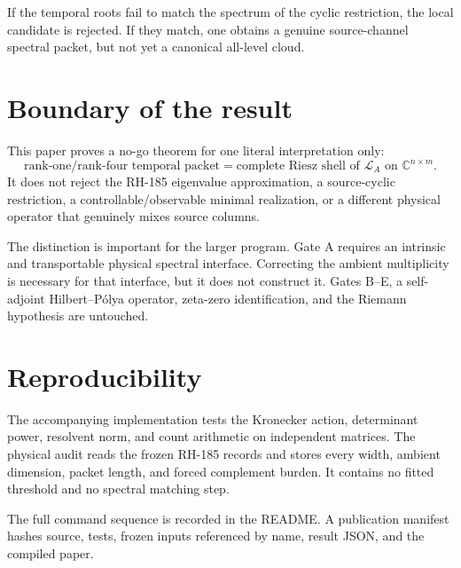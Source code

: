 \documentclass[12pt]{article}
\theoremstyle{remark}
\newcommand{\cL}{\mathcal L}
\begin{document}
If the temporal roots fail to match the spectrum of the cyclic restriction,
the local candidate is rejected.  If they match, one obtains a genuine
source-channel spectral packet, but not yet a canonical all-level cloud.

\section{Boundary of the result}

This paper proves a no-go theorem for one literal interpretation only:
\begin{equation*}
 \text{rank-one/rank-four temporal packet}
 =\text{complete Riesz shell of }\cL_A\text{ on }\mathbb C^{n\times m}.
\end{equation*}
It does not reject the RH-185 eigenvalue approximation, a source-cyclic
restriction, a controllable/observable minimal realization, or a different
physical operator that genuinely mixes source columns.

The distinction is important for the larger program.  Gate A requires an
intrinsic and transportable physical spectral interface.  Correcting the
ambient multiplicity is necessary for that interface, but it does not
construct it.  Gates B--E, a self-adjoint Hilbert--P\'olya operator, zeta-zero
identification, and the Riemann hypothesis are untouched.

\section{Reproducibility}

The accompanying implementation tests the Kronecker action, determinant
power, resolvent norm, and count arithmetic on independent matrices.  The
physical audit reads the frozen RH-185 records and stores every width,
ambient dimension, packet length, and forced complement burden.  It contains
no fitted threshold and no spectral matching step.

The full command sequence is recorded in the README.  A publication
manifest hashes source, tests, frozen inputs referenced by name, result JSON,
and the compiled paper.



\end{document}
